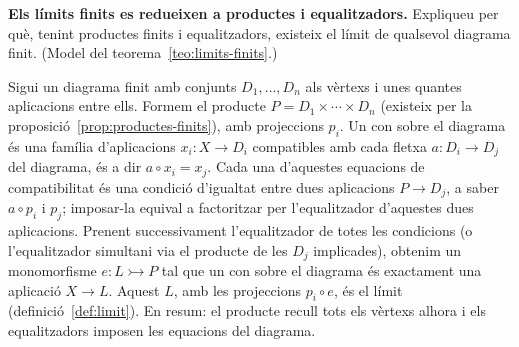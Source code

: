 \begin{exercici}
\textbf{Els límits finits es redueixen a productes i equalitzadors.} Expliqueu per què, tenint productes finits i equalitzadors, existeix el límit de qualsevol diagrama finit. (Model del teorema~\ref{teo:limits-finits}.)
\end{exercici}
\begin{solucio}
Sigui un diagrama finit amb conjunts \(D_1,\dots,D_n\) als vèrtexs i unes quantes aplicacions entre ells. Formem el producte \(P=D_1\times\cdots\times D_n\) (existeix per la proposició~\ref{prop:productes-finits}), amb projeccions \(p_i\). Un con sobre el diagrama és una família d'aplicacions \(x_i:X\to D_i\) compatibles amb cada fletxa \(a:D_i\to D_j\) del diagrama, és a dir \(a\circ x_i=x_j\). Cada una d'aquestes equacions de compatibilitat és una condició d'igualtat entre dues aplicacions \(P\to D_j\), a saber \(a\circ p_i\) i \(p_j\); imposar-la equival a factoritzar per l'equalitzador d'aquestes dues aplicacions. Prenent successivament l'equalitzador de totes les condicions (o l'equalitzador simultani via el producte de les \(D_j\) implicades), obtenim un monomorfisme \(e:L\rightarrowtail P\) tal que un con sobre el diagrama és exactament una aplicació \(X\to L\). Aquest \(L\), amb les projeccions \(p_i\circ e\), és el límit (definició~\ref{def:limit}). En resum: el producte recull tots els vèrtexs alhora i els equalitzadors imposen les equacions del diagrama.
\end{solucio}
